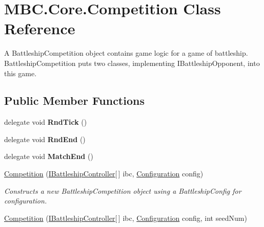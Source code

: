 \hypertarget{class_m_b_c_1_1_core_1_1_competition}{\section{M\-B\-C.\-Core.\-Competition Class Reference}
\label{class_m_b_c_1_1_core_1_1_competition}
}


A Battleship\-Competition object contains game logic for a game of battleship. Battleship\-Competition puts two classes, implementing I\-Battleship\-Opponent, into this game. 


\subsection*{Public Member Functions}
\begin{DoxyCompactItemize}
\item 
\hypertarget{class_m_b_c_1_1_core_1_1_competition_acfa9bb4b8a178d9981e5d4687d1487b2}{delegate void {\bfseries Rnd\-Tick} ()}\label{class_m_b_c_1_1_core_1_1_competition_acfa9bb4b8a178d9981e5d4687d1487b2}

\item 
\hypertarget{class_m_b_c_1_1_core_1_1_competition_a7378a503b4d23466fc27a2bce3ee8a37}{delegate void {\bfseries Rnd\-End} ()}\label{class_m_b_c_1_1_core_1_1_competition_a7378a503b4d23466fc27a2bce3ee8a37}

\item 
\hypertarget{class_m_b_c_1_1_core_1_1_competition_a7eecf4dc6eb7d6e7b3e6bbaf094aa1ac}{delegate void {\bfseries Match\-End} ()}\label{class_m_b_c_1_1_core_1_1_competition_a7eecf4dc6eb7d6e7b3e6bbaf094aa1ac}

\item 
\hypertarget{class_m_b_c_1_1_core_1_1_competition_ae9b5b6e7d2eedcce2956e93cafbca8ff}{\hyperlink{class_m_b_c_1_1_core_1_1_competition_ae9b5b6e7d2eedcce2956e93cafbca8ff}{Competition} (\hyperlink{interface_m_b_c_1_1_core_1_1_i_battleship_controller}{I\-Battleship\-Controller}\mbox{[}$\,$\mbox{]} ibc, \hyperlink{class_m_b_c_1_1_core_1_1_configuration}{Configuration} config)}\label{class_m_b_c_1_1_core_1_1_competition_ae9b5b6e7d2eedcce2956e93cafbca8ff}

\begin{DoxyCompactList}\small\item\em Constructs a new Battleship\-Competition object using a Battleship\-Config for configuration.\end{DoxyCompactList}\item 
\hypertarget{class_m_b_c_1_1_core_1_1_competition_a5613af0d06dd42cd00e13ed2643f88f0}{\hyperlink{class_m_b_c_1_1_core_1_1_competition_a5613af0d06dd42cd00e13ed2643f88f0}{Competition} (\hyperlink{interface_m_b_c_1_1_core_1_1_i_battleship_controller}{I\-Battleship\-Controller}\mbox{[}$\,$\mbox{]} ibc, \hyperlink{class_m_b_c_1_1_core_1_1_configuration}{Configuration} config, int seed\-Num)}\label{class_m_b_c_1_1_core_1_1_competition_a5613af0d06dd42cd00e13ed2643f88f0}


\end{DoxyCompactItemize}
